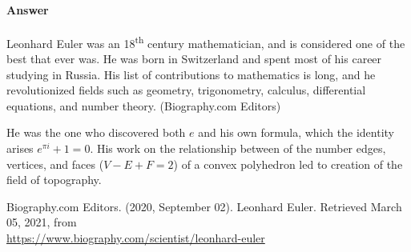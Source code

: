 \documentclass{article}
\begin{document}
\paragraph{Answer}

Leonhard Euler was an 18\textsuperscript{th} century mathematician, and is considered one of the best that 
ever was. He was born in Switzerland and spent most of his career studying in Russia.
His list of contributions to mathematics is long, and he revolutionized fields such as geometry, 
trigonometry, calculus, differential equations, and number theory. (Biography.com Editors)

He was the one who discovered both $e$ and his own formula, which the identity arises $e^{\pi i}+1=0$.
His work on the relationship between of the number edges, vertices, and faces ($V - E + F = 2$) of a convex polyhedron led to
creation of the field of topography.

Biography.com Editors. (2020, September 02). Leonhard Euler. Retrieved March 05, 2021, from \\
\url{https://www.biography.com/scientist/leonhard-euler}
% 
% 
\end{document}
